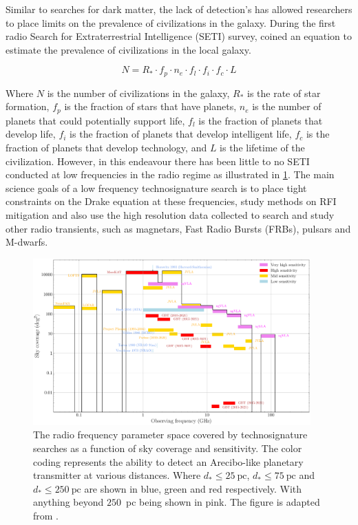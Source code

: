 Similar to searches for dark matter, the lack of detection's has allowed researchers to place limits on the prevalence of civilizations in the galaxy. During the first radio Search for Extraterrestrial Intelligence (SETI) survey, \cite{Drake61Ozman} coined an equation to estimate the prevalence of civilizations in the local galaxy.

\begin{equation}
    N = R_* \cdot f_p \cdot n_e \cdot f_l \cdot f_i \cdot f_c \cdot L
    \label{DrakeEquation}
\end{equation}

Where $N$ is the number of civilizations in the galaxy, $R_*$ is the rate of star formation, $f_p$ is the fraction of stars that have planets, $n_e$ is the number of planets that could potentially support life, $f_l$ is the fraction of planets that develop life, $f_i$ is the fraction of planets that develop intelligent life, $f_c$ is the fraction of planets that develop technology, and $L$ is the lifetime of the civilization. However, in this endeavour there has been little to no SETI conducted at low frequencies in the radio regime as illustrated in \cref{fig:SETI-Frequency-Parameter-Space}. The main science goals of a low frequency technosignature search is to place tight constraints on the Drake equation at these frequencies, study methods on RFI mitigation and also use the high resolution data collected to search and study other radio transients, such as magnetars, Fast Radio Bursts (FRBs), pulsars and M-dwarfs.

\begin{figure}
    \centering
    \includegraphics[width=0.95\textwidth]{figs/SETI-Frequency-Parameter-Space.pdf}
    \caption{The radio frequency parameter space covered by technosignature searches as a function of sky coverage and sensitivity. The color coding represents the ability to detect an Arecibo-like planetary transmitter at various distances. Where $d_* \leq 25 \ \text{pc}$, $d_* \leq 75 \ \text{pc}$ and $d_* \leq 250 \ \text{pc}$ are shown in blue, green and red respectively. With anything beyond $250$~pc being shown in pink. The figure is adapted from \cite{ng_search_2022}.}
    \label{fig:SETI-Frequency-Parameter-Space}
\end{figure}



